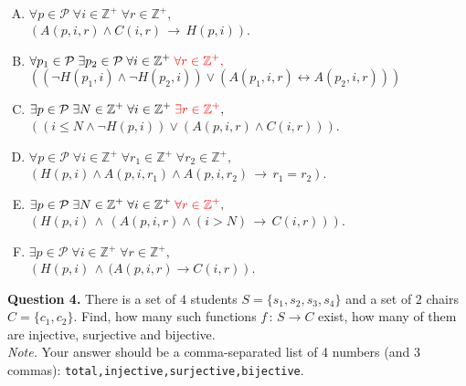 \documentclass[jou]{apa6}
\begin{document}
\begin{enumerate}[(A)]
\item ${\displaystyle \forall p \in \mathcal{P}\; \forall i \in \mathbb{Z}^+\; \forall r \in \mathbb{Z}^+,}$\\
${\displaystyle \left( A(p,i,r) \wedge C(i,r) \,\rightarrow\, H(p,i) \right) }$.
\item ${\displaystyle \forall p_1 \in \mathcal{P}\; \exists p_2 \in \mathcal{P}\;
\forall i \in \mathbb{Z}^{+}\; \textcolor{red}{\forall r \in \mathbb{Z}^{+},}}$\\
${\displaystyle \left( (\neg H(p_1,i) \wedge \neg H(p_2,i)) \vee 
(A(p_1,i,r) \leftrightarrow A(p_2,i,r)) \right)}$
\item ${\displaystyle \exists p \in \mathcal{P}\; \exists N \in \mathbb{Z}^{+}\; 
\forall i \in \mathbb{Z}^{+}\; \textcolor{red}{\exists r \in \mathbb{Z}^{+}},}$\\
${\displaystyle \left( ( i \leq N \wedge \neg H(p,i) ) \vee (A(p,i,r) \wedge C(i,r)) \right)}$.
\item ${\displaystyle \forall p \in \mathcal{P}\; \forall i \in \mathbb{Z}^{+}\; \forall r_1 \in \mathbb{Z}^{+}\;
\forall r_2 \in \mathbb{Z}^{+},}$\\ 
${\displaystyle \left( H(p,i) \wedge A(p,i,r_1) \wedge  A(p,i,r_2) \,\rightarrow\, r_1 = r_2 \right)}$.
\item ${\displaystyle \exists p \in \mathcal{P}\; \exists N \in \mathbb{Z}^{+}\; \forall i \in \mathbb{Z}^{+}\;
\textcolor{red}{\forall r \in \mathbb{Z}^{+}},}$\\
${\displaystyle \left( H(p,i) \,\wedge\, ( A(p,i,r) \wedge (i > N) \,\rightarrow\, C(i,r) ) \right)}$.
\item ${\displaystyle \exists p \in \mathcal{P}\; \forall i \in \mathbb{Z}^{+}\; \forall r \in \mathbb{Z}^{+},}$\\
${\displaystyle \left( H(p,i) \,\wedge\, (A(p,i,r) \rightarrow C(i,r) \right)}$. 
\end{enumerate}



\vspace{10pt}
{\bf Question 4.} There is a set of $4$ students $S = \{ s_1, s_2, s_3, s_4 \}$ and 
a set of $2$ chairs $C = \{ c_1, c_2 \}$. 
Find, how many such functions $f\,:\,S \rightarrow C$ exist, 
how many of them are injective, surjective and bijective.\\
{\em Note.} Your answer should be a comma-separated list of 
4 numbers (and 3 commas): {\tt total,injective,surjective,bijective}.
\end{document}
